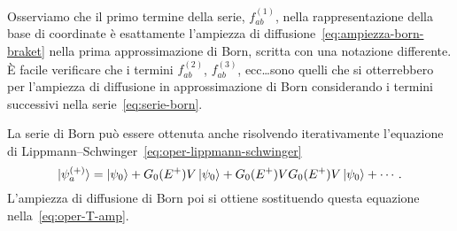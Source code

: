 \documentclass[a4paper,fleqn,twoside,12pt]{article}
\begin{document}
Osserviamo che il primo termine della serie, $f_{ab}^{(1)}$, nella
rappresentazione della base di coordinate è esattamente l'ampiezza di
diffusione~\eqref{eq:ampiezza-born-braket} nella prima approssimazione di Born,
scritta con una notazione differente.  È facile verificare che i termini
$f_{ab}^{(2)}$, $f_{ab}^{(3)}$, ecc\dots sono quelli che si otterrebbero per
l'ampiezza di diffusione in approssimazione di Born considerando i termini
successivi nella serie~\eqref{eq:serie-born}.

La serie di Born può essere ottenuta anche risolvendo iterativamente l'equazione
di Lippmann–Schwinger~\eqref{eq:oper-lippmann-schwinger}
\begin{equation}
  \ket{\psi_{a}^{(+)}} = \ket{\psi_{0}} + G_{0}(E^{+})V\ket{\psi_{0}} +
  G_{0}(E^{+})VG_{0}(E^{+})V\ket{\psi_{0}} + \cdots.
\end{equation}
L'ampiezza di diffusione di Born poi si ottiene sostituendo questa equazione
nella~\eqref{eq:oper-T-amp}.

{}
\printbibliography
\end{document}
